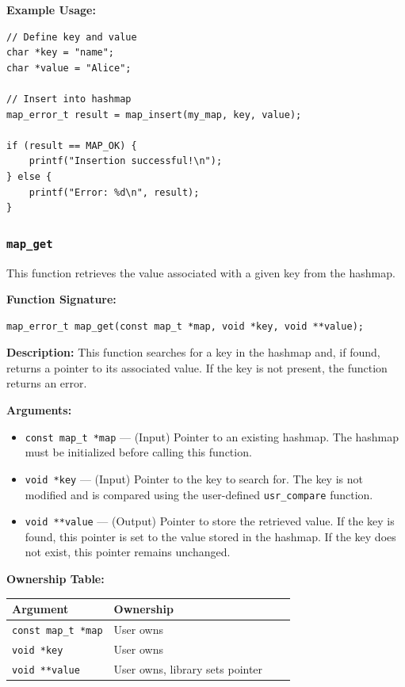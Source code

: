 \documentclass[titlepage]{article}
\begin{document}
\textbf{Example Usage:}
\begin{verbatim}
// Define key and value
char *key = "name";
char *value = "Alice";

// Insert into hashmap
map_error_t result = map_insert(my_map, key, value);

if (result == MAP_OK) {
    printf("Insertion successful!\n");
} else {
    printf("Error: %d\n", result);
}
\end{verbatim}
\subsubsection{\texttt{map\_get}} %

This function retrieves the value associated with a given key from the hashmap.

\textbf{Function Signature:}
\begin{verbatim}
map_error_t map_get(const map_t *map, void *key, void **value);
\end{verbatim}

\textbf{Description:}
This function searches for a key in the hashmap and, if found, returns a pointer to its associated value.
If the key is not present, the function returns an error.

\textbf{Arguments:}
\begin{itemize}
\item \texttt{const map\_t *map} --- (Input) Pointer to an existing hashmap.
The hashmap must be initialized before calling this function.

\item \texttt{void *key} --- (Input) Pointer to the key to search for. The key is not modified and is compared using the
user-defined \texttt{usr\_compare} function.
\item \texttt{void **value} --- (Output) Pointer to store the retrieved value.
If the key is found, this pointer is set to the value stored in the hashmap.
If the key does not exist, this pointer remains unchanged.
\end{itemize}

\textbf{Ownership Table:}
\begin{center}
\begin{tabular}{@{} l l c c @{} }
\toprule
\textbf{Argument} & \textbf{Ownership}  \\
\midrule
\texttt{const map\_t *map} & User owns  \\
\texttt{void *key} & User owns  \\
\texttt{void **value} & User owns, library sets pointer \\
\bottomrule
\end{tabular}
\end{center}
\end{document}
